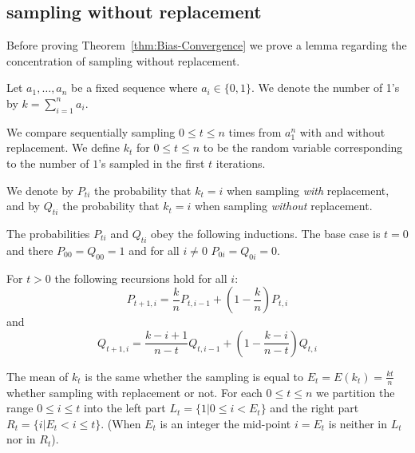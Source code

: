 \subsection{sampling without replacement}
Before proving Theorem~\ref{thm:Bias-Convergence} we prove a 
lemma regarding the concentration of sampling without replacement.

Let $a_1,\ldots,a_n$ be a fixed sequence where $a_i \in
\{0,1\}$. We denote the number of 1's by $k=\sum_{i=1}^n a_i$.

We compare sequentially sampling $0 \leq t \leq n$ times from $a_1^n$ with and
without replacement. We define $k_t$ for $0 \leq t \leq n$ to be the
random variable corresponding to the number of $1$'s sampled in the
first $t$ iterations.

We denote by $P_{ti}$ the probability that $k_t=i$ when sampling {\em
  with} replacement, and by $Q_{ti}$ the probability that $k_t=i$ when
sampling {\em without} replacement.

The probabilities $P_{ti}$ and $Q_{ti}$ obey the following inductions. 
The base case is $t=0$ and there $P_{00}=Q_{00}=1$ and for all $i\neq
0$ $P_{0i}=Q_{0i}=0$.

For $t>0$ the following recursions hold for all $i$:
\[
P_{t+1,i}=\frac{k}{n}P_{t,i-1} + \left(1-\frac{k}{n}\right)P_{t,i}
\]
and
\[
Q_{t+1,i}=\frac{k-i+1}{n-t}Q_{t,i-1} + \left(1-\frac{k-i}{n-t}\right)Q_{t,i}
\]

The mean of $k_t$ is the same whether the sampling is equal to
$E_t=E(k_t)=\frac{kt}{n}$ whether sampling with replacement or
not. For each $0\leq t \leq n$ we partition the range $0\leq i \leq t$
into the left part $L_t = \{1 | 0 \leq i <E_t \}$
and the right part $R_t=\{i | E_t < i \leq t\}$. (When
$E_t$ is an integer the mid-point $i=E_t$ is neither in $L_t$ nor in $R_t$).

